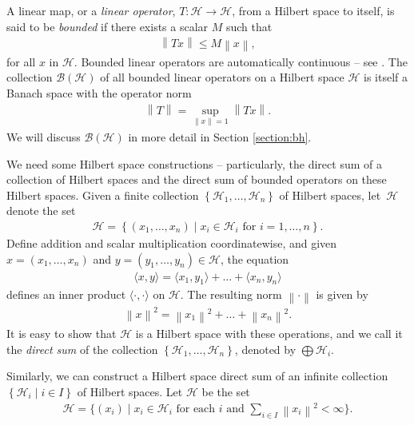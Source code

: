 \documentclass[11pt,a4paper]{report}
\theoremstyle{plain}
\theoremstyle{definition}
\newcommand{\1}{\mathbbm{1}}
\renewcommand{\H}{\mathcal{H}}
\newcommand{\B}{\mathcal{B}}
\newcommand{\BH}{\mathcal{\B(\H)}}
\renewcommand{\oplus}{\textstyle\bigoplus}
\begin{document}
A linear map, or a \emph{linear operator}, $T:\H\to\H$, from a Hilbert space to 
itself, is said to be \emph{bounded} if there exists a scalar $M$ such that 
\begin{align*}
	\left\|Tx\right\| \leq M \left\|x\right\|,
\end{align*}
for all $x$ in $\H$. Bounded linear operators are automatically continuous -- 
see \cite[1.32]{rudin91}. The collection $\BH$ of all bounded linear operators 
on a Hilbert space $\H$ is itself a Banach space with the operator norm 
\begin{align*}
	 \left\| T \right\| = \sup_{\|x\|=1} \left \|  Tx \right\|.
\end{align*}
We will discuss $\BH$ in more detail in Section \ref{section:bh}. 

We need some Hilbert space constructions -- particularly, the direct sum of a 
collection of Hilbert spaces and the direct sum of bounded operators on these 
Hilbert spaces. Given a finite collection $\left\{\H_1,\dots,\H_n\right\}$ of Hilbert 
spaces, let~$\H$ denote the set
\begin{align*}
	\H  = \left\{(x_1,\dots,x_n) \mid x_i \in \H_i \mbox { for } i=1,\dots,n \right\}.
\end{align*}
Define addition and scalar multiplication coordinatewise, and given 
$x=(x_1,\dots,x_n)$ and $y=(y_1,\dots,y_n) \in \H$, the equation
\begin{align*}
	\langle x,y\rangle = \langle x_1,y_1\rangle + \dots + \langle x_n,y_n \rangle
\end{align*}
defines an inner product $\langle\cdot,\cdot\rangle$ on $\H$. The resulting norm 
$\left\|\cdot\right\|$ is given by
\begin{align*}
	\left\|x\right\|^2 = \left\|x_1\right\|^2 + \dots + \left\|x_n\right\|^2.
\end{align*}
It is easy to show that $\H$ is a Hilbert space with these operations, and we 
call it the \emph{direct sum} of the collection 
$\left\{\H_1,\dots,\H_n\right\}$, denoted by $\oplus\H_i$.

Similarly, we can construct a Hilbert space direct sum of an infinite collection 
$\left\{\H_i \mid i\in I\right\}$ of Hilbert spaces. Let $\H$ be the set
\begin{align*}
	\H= \Big\{(x_i) \mid x_i \in \H_i \mbox{ for each }i 
					\mbox{ and } \sum_{i\in I}{\left\|x_i\right\|^2} < \infty \Big\}.
\end{align*}
\end{document}
